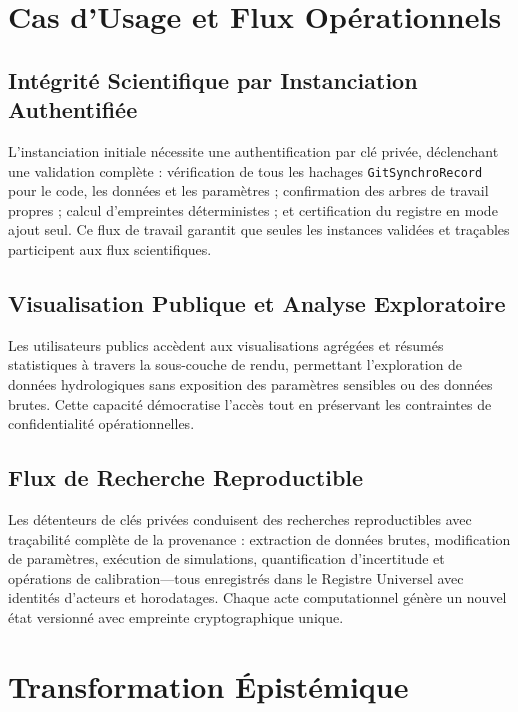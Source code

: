 \section*{Cas d'Usage et Flux Opérationnels}

\subsection*{Intégrité Scientifique par Instanciation Authentifiée}

L'instanciation initiale nécessite une authentification par clé privée, déclenchant une validation complète : vérification de tous les hachages \texttt{GitSynchroRecord} pour le code, les données et les paramètres ; confirmation des arbres de travail propres ; calcul d'empreintes déterministes ; et certification du registre en mode ajout seul. Ce flux de travail garantit que seules les instances validées et traçables participent aux flux scientifiques.

\subsection*{Visualisation Publique et Analyse Exploratoire}

Les utilisateurs publics accèdent aux visualisations agrégées et résumés statistiques à travers la sous-couche de rendu, permettant l'exploration de données hydrologiques sans exposition des paramètres sensibles ou des données brutes. Cette capacité démocratise l'accès tout en préservant les contraintes de confidentialité opérationnelles.

\subsection*{Flux de Recherche Reproductible}

Les détenteurs de clés privées conduisent des recherches reproductibles avec traçabilité complète de la provenance : extraction de données brutes, modification de paramètres, exécution de simulations, quantification d'incertitude et opérations de calibration---tous enregistrés dans le Registre Universel avec identités d'acteurs et horodatages. Chaque acte computationnel génère un nouvel état versionné avec empreinte cryptographique unique.

\section*{Transformation Épistémique}

